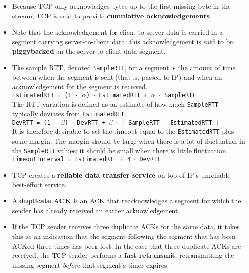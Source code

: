\begin{itemize}
\item
Because TCP only acknowledges bytes up to the first missing byte in the stream, TCP is said to provide \textbf{cumulative acknowledgements}.

\item
Note that the acknowledgement for client-to-server data is carried in a segment carrying server-to-client data; this acknowledgement is said to be \textbf{piggybacked} on the server-to-client data segment.

\item
The sample RTT, denoted \texttt{SampleRTT}, for a segment is the amount of time between when the segment is sent (that is, passed to IP) and when an acknowledgement for the segment is received.\\
\hspace*{1em}\texttt{EstimatedRTT = (1 - $\alpha$) $\cdot$ EstimatedRTT + $\alpha$ $\cdot$ SampleRTT }\\
The RTT variation is defined as an estimate of how much \texttt{SampleRTT} typically deviates from \texttt{EstimatedRTT}.\\
\hspace*{1em}\texttt{DevRTT = (1 - $\beta$) $\cdot$ DevRTT + $\beta$ $\cdot$ | SampleRTT - EstimatedRTT |}\\
It is therefore desirable to set the timeout equal to the \texttt{EstimatedRTT} plus some margin. The margin should be large when there is a lot of fluctuation in the \texttt{SampleRTT} values; it should be small when there is little fluctuation.\\
\hspace*{1em}\texttt{TimeoutInterval = EstimatedRTT + 4 $\cdot$ DevRTT}

\item
TCP creates a \textbf{reliable data transfer service} on top of IP's unreliable best-effort service.

\item
A \textbf{duplicate ACK} is an ACK that reacknowledges a segment for which the sender has already received an earlier acknowledgement.

\item
If the TCP sender receives three duplicate ACKs for the same data, it takes this as an indication that the segment following the segment that has been ACKed three times has been lost. In the case that three duplicate ACKs are received, the TCP sender performs a \textbf{fast retransmit}, retransmitting the missing segment \textit{before} that segment's timer expires.


\end{itemize}
